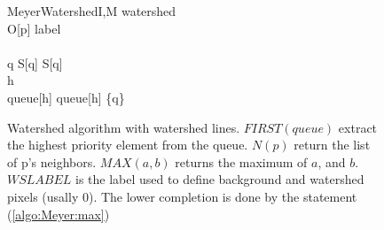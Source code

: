 \documentclass{InsightArticle}
\begin{document}
\begin{figure}[htbp]
\begin{pseudocode}[framebox]{MeyerWatershed}{I,M}
    \IF \neg watershed
    \THEN
      \BEGIN
         \\
        O[p] \GETS label \\
         \\
        \FOREACH q \in {} \DO
        \BEGIN
          \IF \neg S[q]
          \THEN
            \BEGIN
            S[q] \GETS \TRUE \\
            h \GETS {}  \\
            queue[h] \GETS queue[h] \cup \{q\} \\
            \END
        \END
      \END
  \END
\END
\end{pseudocode}
\caption{Watershed algorithm with watershed lines.\label{MeyerAlgorithm} $FIRST(queue)$ extract the highest priority element from the queue. $N(p)$ return the list of p's neighbors. $MAX(a,b)$ returns the maximum of $a$, and $b$. $WSLABEL$ is the label used to define background and watershed pixels (usally $0$). The lower completion is done by the statement (\ref{algo:Meyer:max})}
\end{figure}




% 	
% 
% 
%  
% 
% 	
% 
%         
\end{document}
